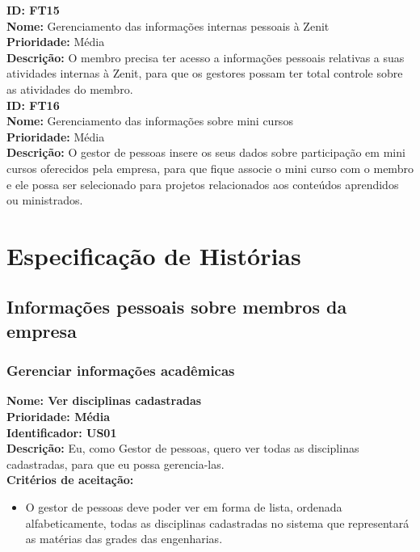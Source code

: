 \begin{anexosenv}
\textbf{ID: FT15}\\
\textbf{Nome:} Gerenciamento das informações internas pessoais à Zenit\\
\textbf{Prioridade:} Média\\
\textbf{Descrição:} O membro precisa ter acesso a informações pessoais relativas a suas atividades internas à Zenit, para que os gestores possam ter total controle sobre as atividades do membro.\\

\textbf{ID: FT16}\\
\textbf{Nome:} Gerenciamento das informações sobre mini cursos\\
\textbf{Prioridade:} Média\\
\textbf{Descrição:} O gestor de pessoas insere os seus dados sobre participação em mini cursos oferecidos pela empresa, para que fique associe o mini curso com o membro e ele possa ser selecionado para projetos relacionados aos conteúdos aprendidos ou ministrados.\\

\chapter{Especificação de Histórias}

\section{Informações pessoais sobre membros da empresa}
\subsection{Gerenciar informações acadêmicas}

\textbf{Nome: Ver disciplinas cadastradas\\
    Prioridade: Média\\
    Identificador: US01\\
    Descrição:}
    Eu, como Gestor de pessoas, quero ver todas as disciplinas cadastradas, para que eu possa gerencia-las.\\
\textbf{Critérios de aceitação:}
 \begin{itemize}
            \item O gestor de pessoas deve poder ver em forma de lista, ordenada alfabeticamente, todas as disciplinas cadastradas no sistema que representará as matérias das grades das engenharias.
\end{itemize}
        


\end{anexosenv}
